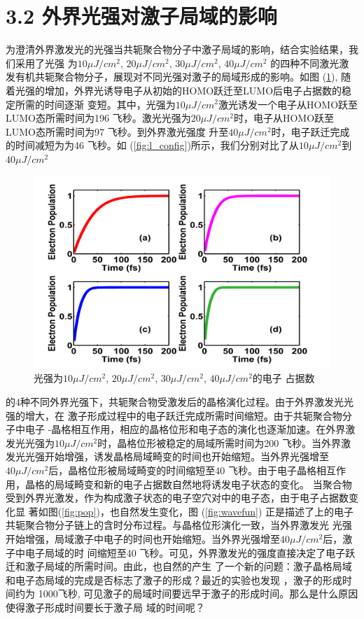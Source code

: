 \documentclass[12pt,]{report}
\begin{document}
\section{3.2
外界光强对激子局域的影响}\label{ux5916ux754cux5149ux5f3aux5bf9ux6fc0ux5b50ux5c40ux57dfux7684ux5f71ux54cd}

为澄清外界激发光的光强当共轭聚合物分子中激子局域的影响，结合实验结果，我们采用了光强
为\(10\mu J/cm^2\), \(20\mu J/cm^2\), \(30\mu J/cm^2\), \(40\mu J/cm^2\)
的四种不同激光激发有机共轭聚合物分子，展现对不同光强对激子的局域形成的影响。如图
(\ref{fig:pop4}),
随着光强的增加，外界光诱导电子从初始的HOMO跃迁至LUMO后电子占据数的稳定所需的时间逐渐
变短。其中，光强为\(10\mu J/cm^2\)激光诱发一个电子从HOMO跃至LUMO态所需时间为196
飞秒。激光光强为\(20\mu J/cm^2\)时，电子从HOMO跃至LUMO态所需时间为97
飞秒。到外界激光强度
升至\(40\mu J/cm^2\)时，电子跃迁完成的时间减短为为46 飞秒。如
(\ref{fig:l_config})所示，我们分别对比了从\(10\mu J/cm^2\)到\(40\mu J/cm^2\)

\begin{figure}[h!] 
    \centering
    \includegraphics[scale=1]{./figures/Exciton_Figure_11.png}
    \caption{光强为$10\mu J/cm^2$, $20\mu J/cm^2$, $30\mu J/cm^2$, $40\mu J/cm^2$的电子
    占据数}
    \label{fig:pop4}
\end{figure}

\noindent
的4种不同外界光强下，共轭聚合物受激发后的晶格演化过程。由于外界激发光光强的增大，在
激子形成过程中的电子跃迁完成所需时间缩短。由于共轭聚合物分子中电子
-晶格相互作用，相应的晶格位形和电子态的演化也逐渐加速。在外界激发光光强为\(10\mu J/cm^2\)时，晶格位形被稳定的局域所需时间为200
飞秒。当外界激发光光强开始增强，诱发晶格局域畸变的时间也开始缩短。当外界光强增至
\(40\mu J/cm^2\)后，晶格位形被局域畸变的时间缩短至40
飞秒。由于电子晶格相互作用，晶格的局域畸变和新的电子占据数自然地将诱发电子状态的变化。
当聚合物受到外界光激发，作为构成激子状态的电子空穴对中的电子态，由于电子占据数变化显
著如图(\ref{fig:pop})，也自然发生变化，图 (\ref{fig:wavefun})
正是描述了上的电子共轭聚合物分子链上的含时分布过程。与晶格位形演化一致，当外界激发光
光强开始增强，局域激子中电子的时间也开始缩短。当外界光强增至\(40\mu J/cm^2\)后，激子中电子局域的时
间缩短至40
飞秒。可见，外界激发光的强度直接决定了电子跃迁和激子局域的所需时间。由此，也自然的产生
了一个新的问题：激子晶格局域和电子态局域的完成是否标志了激子的形成？最近的实验也发现
，激子的形成时间约为 1000飞秒,
可见激子的局域时间要远早于激子的形成时间。那么是什么原因使得激子形成时间要长于激子局
域的时间呢？
\end{document}
